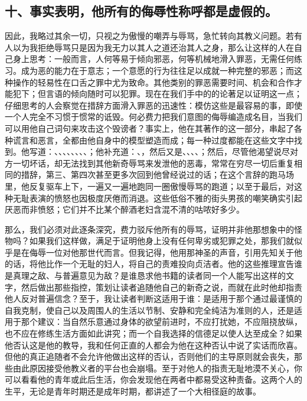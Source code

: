 
\subsection{十、事实表明，他所有的侮辱性称呼都是虚假的。}

因此，我略过其余一切，只视之为傲慢的嘲弄与辱骂，急忙转向其教义问题。若有人以为我拒绝辱骂只是因为我无力以其人之道还治其人之身，那么让这样的人在自己身上思考：一般而言，人何等易于倾向邪恶，何等机械地滑入罪恶，无需任何练习。成为恶的能力在于意志；一个意愿的行为往往足以成就一种完整的邪恶；而这种操作的轻易性在口舌之罪中尤为致命。其他类别的罪恶需要时间、机会和合作才能犯下；但言语的倾向随时可以犯罪。现在在我们手中的的论著足以证明这一点；仔细思考的人会察觉在措辞方面滑入罪恶的迅速性：模仿这些是最容易的事，即使一个人完全不习惯于惯常的诋毁。何必费力把我们意图的侮辱编造成名目，当我们可以用他自己词句来攻击这个毁谤者？事实上，他在其著作的这一部分，串起了各种谎言和恶言，全都由他自身中的模型塑造而成；每一种过度都能在这些文字中找到。他写道：、、、、、、、、；他补充道：、，然后又是、、、、；然后，尽管他渴望说尽对方一切坏话，却无法找到其他新奇辱骂来发泄他的恶毒，常常在穷尽一切后重复相同的措辞，第三、第四次甚至更多次回到他曾经说过的话；在这个言辞的跑马场里，他反复驱车上下，一遍又一遍地跑同一圈傲慢辱骂的跑道；以至于最后，对这种无耻表演的愤怒也因极度厌倦而消退。这些低俗不雅的街头男孩的嘲笑确实引起厌恶而非愤怒；它们并不比某个醉酒老妇含混不清的咕哝好多少。\par

那么，我们必须对此逐条深究，费力驳斥他所有的辱骂，证明并非他那想象中的怪物吗？如果我们这样做，满足于证明他身上没有任何卑劣或犯罪之处，那我们就似乎是在侮辱一位对他那世代而言。但我记得，他用那神圣的声音，引用先知关于他的话，将他比作一个无耻的妇人，将自己的责难投向贞洁者。他的这些推理宣告谁是真理之敌、与普遍意见为敌？是谁恳求他书籍的读者同一个人能写出这样的文字，然后做出那些指控，策划让读者追随他自己的新奇之说，而就在此时他却指责他人反对普遍信念？至于，我让读者判断这适用于谁：是适用于那个通过最谨慎的自我克制，使自己以及周围人的生活以节制、安静和完全纯洁为准则的人，还是适用于那个建议：当自然乐意通过身体的欲望前进时，不应打扰她，不应阻挠放纵，也不应在修练生活方面如此讲究；而一个自我选择的信德足以使人达至成全？如果他否认这是他的教导，我和任何正直的人都会为他在这种否认中说了实话而欣喜。但他的真正追随者不会允许他做出这样的否认，否则他们的主导原则就会丧失，那些由此原因接受他教义者的平台也会崩塌。至于对他人的指责无耻地漠不关心，你可以看看他的青年或此后生活，你会发现他在两者中都易受这种责备。这两个人的生平，无论是青年时期还是成年时期，都讲述了一个大相径庭的故事。\par

